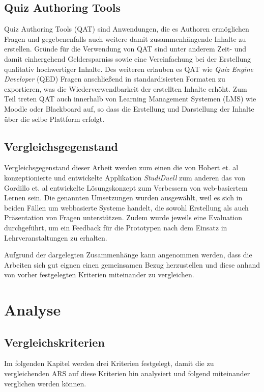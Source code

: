 \documentclass[conference]{IEEEtran}
\begin{document}
\subsection{Quiz Authoring Tools}
Quiz Authoring Tools (QAT) sind Anwendungen, die es Authoren ermöglichen Fragen und gegebenenfalls auch weitere damit zusammenhängende Inhalte zu erstellen. Gründe für die Verwendung von QAT sind unter anderem Zeit- und damit einhergehend Geldersparniss sowie eine Vereinfachung bei der Erstellung qualitativ hochwertiger Inhalte. Des weiteren erlauben es QAT wie \emph{Quiz Engine Developer} (QED) Fragen anschließend in standardisierten Formaten zu exportieren, was die Wiederverwendbarkeit der erstellten Inhalte erhöht. Zum Teil treten QAT auch innerhalb von Learning Management Systemen (LMS) wie Moodle oder Blackboard auf, so dass die Erstellung und Darstellung der Inhalte über die selbe Plattform erfolgt. \cite[p. 2]{Gordillo2015} 

\subsection{Vergleichsgegenstand}
Vergleichsgegenstand dieser Arbeit werden zum einen die von Hobert et. al konzeptionierte und entwickelte Applikation \emph{StudiDuell}\cite{Hobert2017} zum anderen das von Gordillo et. al entwickelte Lösungskonzept zum Verbessern von web-basiertem Lernen \cite{Gordillo2015} sein. Die genannten Umsetzungen wurden ausgewählt, weil es sich in beiden Fällen um webbasierte Systeme handelt, die sowohl Erstellung als auch Präsentation von Fragen unterstützen. Zudem wurde jeweils eine Evaluation durchgeführt, um ein Feedback für die Prototypen nach dem Einsatz in Lehrveranstaltungen zu erhalten.
\cite{Hobert2017} \cite{Gordillo2015}

Aufgrund der dargelegten Zusammenhänge kann angenommen werden, dass die Arbeiten sich gut eignen einen gemeinsamen Bezug herzustellen und diese anhand von vorher festgelegten Kriterien miteinander zu vergleichen.

\section{Analyse}

\subsection{Vergleichskriterien}
Im folgenden Kapitel werden drei Kriterien festgelegt, damit die zu vergleichenden ARS auf diese Kriterien hin analysiert und folgend miteinander verglichen werden können.
\\
\end{document}
